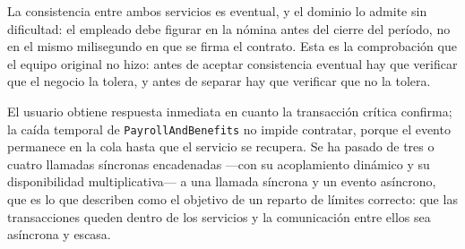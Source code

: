 La consistencia entre ambos servicios es eventual, y el dominio lo admite sin dificultad: el empleado debe figurar en la nómina antes del cierre del período, no en el mismo milisegundo en que se firma el contrato. Esta es la comprobación que el equipo original no hizo: antes de aceptar consistencia eventual hay que verificar que el negocio la tolera, y antes de separar hay que verificar que no la tolera.

El usuario obtiene respuesta inmediata en cuanto la transacción crítica confirma; la caída temporal de \texttt{PayrollAndBenefits} no impide contratar, porque el evento permanece en la cola hasta que el servicio se recupera. Se ha pasado de tres o cuatro llamadas síncronas encadenadas ---con su acoplamiento dinámico y su disponibilidad multiplicativa--- a una llamada síncrona y un evento asíncrono, que es lo que \textcite{fordhardparts2021} describen como el objetivo de un reparto de límites correcto: que las transacciones queden dentro de los servicios y la comunicación entre ellos sea asíncrona y escasa.
